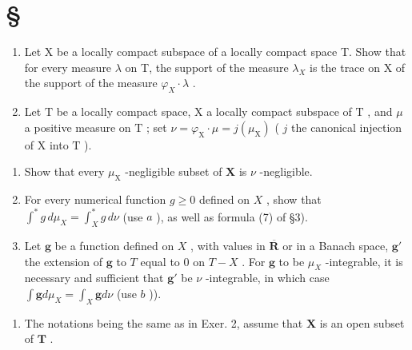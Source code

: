 \section*{\texorpdfstring{\S\CurrentExerciseGroup}{Section \CurrentExerciseGroup}}
{}

\begin{enumerate}
\def\labelenumi{\arabic{enumi})}
\item
  Let X be a locally compact subspace of a locally compact space T. Show that for every measure \(\lambda\) on T, the support of the measure \(\lambda_{X}\) is the trace on X of the support of the measure \(\varphi_{X} \cdot \lambda\) .
\item
  Let \(\mathrm{T}\) be a locally compact space, \(\mathrm{X}\) a locally compact subspace of \(\mathrm{T}\) , and \(\mu\) a positive measure on \(\mathrm{T}\) ; set \(\nu = \varphi_{\mathrm{X}} \cdot \mu = j(\mu_{\mathrm{X}})\) ( \(j\) the canonical injection of \(\mathrm{X}\) into \(\mathrm{T}\) ).
\end{enumerate}

\begin{enumerate}
\def\labelenumi{\alph{enumi})}
\item
  Show that every \(\mu_{\mathrm{X}}\) -negligible subset of \(\mathbf{X}\) is \(\nu\) -negligible.
\item
  For every numerical function \(g \geqslant 0\) defined on \(X\) , show that \(\int^{*} g \, d\mu_{X} = \int_{X}^{*} g \, d\nu\) (use \(a\) ), as well as formula (7) of §3).
\item
  Let \(\mathbf{g}\) be a function defined on \(X\) , with values in \(\overline{\mathbf{R}}\) or in a Banach space, \(\mathbf{g}'\) the extension of \(\mathbf{g}\) to \(T\) equal to 0 on \(T - X\) . For \(\mathbf{g}\) to be \(\mu_{X}\) -integrable, it is necessary and sufficient that \(\mathbf{g}'\) be \(\nu\) -integrable, in which case \(\int \mathbf{g} d\mu_X = \int_X \mathbf{g} d\nu\) (use \(b\) )).
\end{enumerate}

\begin{enumerate}
\def\labelenumi{\arabic{enumi})}
\setcounter{enumi}{2}
\tightlist
\item
  The notations being the same as in Exer. 2, assume that \(\mathbf{X}\) is an open subset of \(\mathbf{T}\) .
\end{enumerate}


